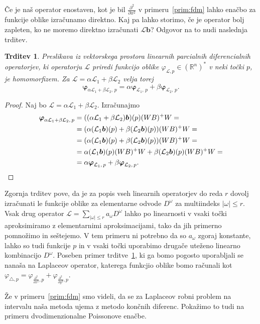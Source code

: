 \documentclass[12pt,a4paper,twoside]{article}
\theoremstyle{definition} %
\theoremstyle{plain} %
\newtheorem{trditev}[definicija]{Trditev}
\numberwithin{equation}{section}
\newcommand{\R}{\mathbb R}
\renewcommand{\L}{\mathcal{L}}
\newcommand{\lap}{\triangle}
\renewcommand{\b}{\boldsymbol}
\renewcommand{\phi}{\varphi}
\newcommand{\dpar}[2]{\ensuremath{\frac{\partial #1}{\partial #2}}}
\begin{document}
Če je naš operator enostaven, kot je bil $\dpar{^2}{x^2}$ v primeru~\ref{prim:fdm}
lahko enačbo za funkcije oblike izračunamo direktno. Kaj pa lahko storimo, če je operator bolj
zapleten, ko ne moremo direktno izračunati $\L \b b$? Odgovor na to nudi naslednja trditev.
\begin{trditev}
  \label{trd:shape-linear}
  Preslikava iz vektorskega prostora linearnih parcialnih diferencialnih operatorjev, ki operatorju
  $\L$ priredi funkcijo oblike $\phi_{\L, p} \in (\R^n)^\ast$ v neki točki $p$, je homomorfizem. Za
  $\L = \alpha \L_1 + \beta \L_2$ velja torej
  \begin{equation}
    \b{\phi}_{\alpha \L_1 + \beta \L_2,\,p} =  \alpha \b{\phi}_{\L_1,\,p} + \beta \b{\phi}_{\L_2,\,p}.
  \end{equation}
\end{trditev}
\begin{proof}
Naj bo $\L = \alpha \L_1 + \beta \L_2$. Izračunajmo
  \begin{align*}
    \b{\phi}_{\alpha \L_1 + \beta \L_2,\,p} &=
    ((\alpha \L_1 + \beta \L_2)\b b)(p)(WB)^+W = \\
    &= (\alpha (\L_1\b b)(p) + \beta (\L_2\b b)(p))(WB)^+W = \\
    &= (\alpha (\L_1\b b)(p) + \beta (\L_2\b b)(p))(WB)^+W =\\
  &= \alpha (\L_1\b b)(p)(WB)^+W + \beta (\L_2\b b)(p)(WB)^+W = \\
  &= \alpha \b{\phi}_{\L_1,\,p} + \beta \b{\phi}_{\L_2,\,p}. \qedhere
  \end{align*}
\end{proof}
Zgornja trditev pove, da je za popis vseh linearnih operatorjev do reda $r$ dovolj izračunati le
funkcije oblike za elementarne odvode $D^\omega$ za multiindeks $|\omega| \leq r$.  Vsak drug
operator $\L = \sum_{|\omega| \leq r} a_\omega D^\omega$ lahko po linearnosti v vsaki točki
aproksimiramo z elementarnimi aproksimacijami, tako da jih primerno pomnožimo in seštejemo. V tem
primeru ni potrebno da so $a_\omega$ zgoraj konstante, lahko so tudi funkcije $p$ in v vsaki točki
uporabimo drugače uteženo linearno kombinacijo $D^\omega$.  Poseben primer
trditve~\ref{trd:shape-linear}, ki ga bomo pogosto uporabljali se nanaša na Laplaceov operator,
katerega funkcjio oblike bomo računali kot $\phi_{\lap, p} = \phi_{\dpar{^2}{x^2}, p} +
\phi_{\dpar{^2}{y^2}, p}$.

Že v primeru~\ref{prim:fdm} smo videli, da se za Laplaceov robni problem na
intervalu naša metoda ujema z metodo končnih diferenc. Pokažimo to tudi na
primeru dvodimenzionalne Poissonove enačbe.
\end{document}
